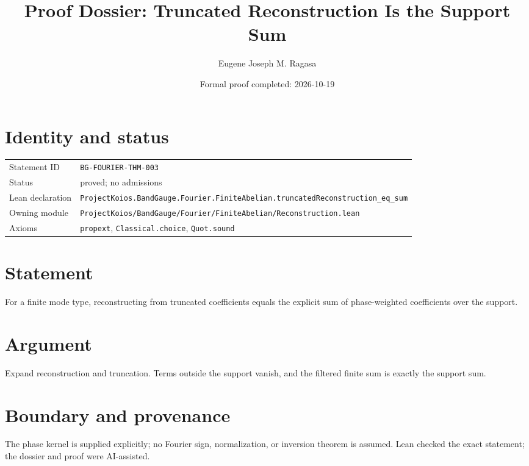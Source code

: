 \documentclass[11pt]{article}
\title{Proof Dossier: Truncated Reconstruction Is the Support Sum}
\author{Eugene Joseph M. Ragasa}
\date{Formal proof completed: 2026-10-19}
\begin{document}
\maketitle
\section{Identity and status}
\begin{tabularx}{\textwidth}{@{}lX@{}}\toprule
Statement ID & \texttt{BG-FOURIER-THM-003} \\
Status & proved; no admissions \\
Lean declaration & \texttt{ProjectKoios.BandGauge.Fourier.FiniteAbelian.}\newline\texttt{truncatedReconstruction\_eq\_sum} \\
Owning module & \texttt{ProjectKoios/BandGauge/Fourier/FiniteAbelian/Reconstruction.lean} \\
Axioms & \texttt{propext}, \texttt{Classical.choice}, \texttt{Quot.sound} \\
\bottomrule\end{tabularx}
\section{Statement}
For a finite mode type, reconstructing from truncated coefficients equals the explicit sum of phase-weighted coefficients over the support.
\section{Argument}
Expand reconstruction and truncation. Terms outside the support vanish, and the filtered finite sum is exactly the support sum.
\section{Boundary and provenance}
The phase kernel is supplied explicitly; no Fourier sign, normalization, or inversion theorem is assumed. Lean checked the exact statement; the dossier and proof were AI-assisted.
\end{document}
